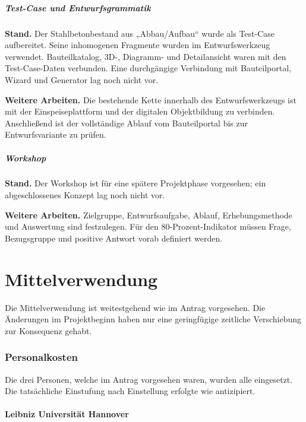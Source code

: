 \documentclass[type=zwischenbericht,theme=dark]{zukunftbau}
\begin{document}
\subsubsection{Test-Case und Entwurfsgrammatik}

\textbf{Stand.} Der Stahlbetonbestand aus „Abbau/Aufbau“ wurde als Test-Case aufbereitet. Seine inhomogenen Fragmente wurden im Entwurfswerkzeug verwendet. Bauteilkatalog, 3D-, Diagramm- und Detailansicht waren mit den Test-Case-Daten verbunden. Eine durchgängige Verbindung mit Bauteilportal, Wizard und Generator lag noch nicht vor.

\textbf{Weitere Arbeiten.} Die bestehende Kette innerhalb des Entwurfswerkzeugs ist mit der Einspeiseplattform und der digitalen Objektbildung zu verbinden. Anschließend ist der vollständige Ablauf vom Bauteilportal bis zur Entwurfsvariante zu prüfen.

\subsubsection{Workshop}

\textbf{Stand.} Der Workshop ist für eine spätere Projektphase vorgesehen; ein abgeschlossenes Konzept lag noch nicht vor.

\textbf{Weitere Arbeiten.} Zielgruppe, Entwurfsaufgabe, Ablauf, Erhebungsmethode und Auswertung sind festzulegen. Für den 80-Prozent-Indikator müssen Frage, Bezugsgruppe und positive Antwort vorab definiert werden.

\part{Mittelverwendung}

Die Mittelverwendung ist weitestgehend wie im Antrag vorgesehen. Die Änderungen im Projektbeginn haben nur eine geringfügige zeitliche Verschiebung zur Konsequenz gehabt.

\section{Personalkosten}

Die drei Personen, welche im Antrag vorgesehen waren, wurden alle eingesetzt. Die tatsächliche Einstufung nach Einstellung erfolgte wie antizipiert.

\subsection{Leibniz Universität Hannover}
\end{document}

